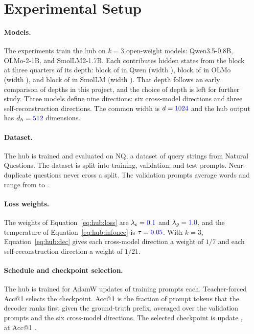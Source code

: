 \section{Experimental Setup}\label{sec:hub:setup}

\paragraph{Models.} The experiments train the hub on $k=3$ open-weight models: Qwen3.5-0.8B, OLMo-2-1B, and SmolLM2-1.7B.
Each contributes hidden states from the block at three quarters of its depth: block  of  in Qwen (width ), block  of  in OLMo (width ), and block  of  in SmolLM (width ).
That depth follows an early comparison of depths in this project, and the choice of depth is left for further study.
Three models define nine directions: six cross-model directions and three self-reconstruction directions.
The common width is $d=\textcolor{blue}{1024}$ and the hub output has $d_h=\textcolor{blue}{512}$ dimensions.

\paragraph{Dataset.} The hub is trained and evaluated on NQ, a dataset of query strings from Natural Questions.
The dataset is split into  training,  validation, and  test prompts.
Near-duplicate questions never cross a split.
The validation prompts average  words and range from  to .

\paragraph{Loss weights.} The weights of Equation~\ref{eq:hub:loss} are $\lambda_{c}=\textcolor{blue}{0.1}$ and $\lambda_{g}=\textcolor{blue}{1.0}$, and the temperature of Equation~\ref{eq:hub:infonce} is $\tau=\textcolor{blue}{0.05}$.
With $k=3$, Equation~\ref{eq:hub:dec} gives each cross-model direction a weight of $1/7$ and each self-reconstruction direction a weight of $1/21$.

\paragraph{Schedule and checkpoint selection.} The hub is trained for  AdamW updates of  training prompts each.
Teacher-forced Acc@1 selects the checkpoint.
Acc@1 is the fraction of prompt tokens that the decoder ranks first given the ground-truth prefix, averaged over the  validation prompts and the six cross-model directions.
The selected checkpoint is update , at Acc@1 .

